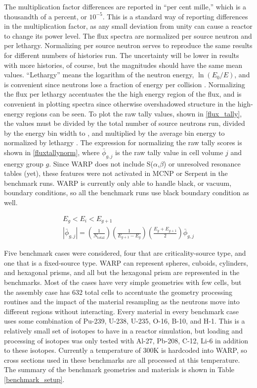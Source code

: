 The multiplication factor differences are reported in ``per cent mille,'' which is a thousandth of a percent, or $10^{-5}$.  This is a standard way of reporting differences in the multiplication factor, as any small deviation from unity can cause a reactor to change its power level.  The flux spectra are normalized per source neutron and per lethargy.  Normalizing per source neutron serves to reproduce the same results for different numbers of histories run.  The uncertainty will be lower in results with more histories, of course, but the magnitudes should have the same mean values.   ``Lethargy'' means the logarithm of the neutron energy, $\ln(E_0/E)$, and is convenient since neutrons lose a fraction of energy per collision \cite{duderstadt}.  Normalizing the flux per lethargy accentuates the the high energy region of the flux, and is convenient in plotting spectra since otherwise overshadowed structure in the high-energy regions can be seen.  To plot the raw tally values, shown in \eqref{flux_tally}, the values must be divided by the total number of source neutrons run, divided by the energy bin width to , and multiplied by the average bin energy to normalized by lethargy \cite{lethargyplot}.  The expression for normalizing the raw tally scores is shown in \eqref{fluxtallynorm}, where $\bar{\phi}_{g,j}$ is the raw tally value in cell volume $j$ and energy group $g$.  Since WARP does not include S($\alpha$,$\beta$) or unresolved resonance tables (yet), these features were not activated in MCNP or Serpent in the benchmark runs.  WARP is currently only able to handle black, or vacuum, boundary conditions, so all the benchmark runs use black boundary condition as well.

\begin{equation}
\label{fluxtallynorm}
\begin{gathered}
E_g < E_i < E_{g+1} \\
|\bar{\phi}_{g,j}| = \left( \frac{1}{N_\mathrm{total}}\right) \left(\frac{1}{E_{g+1}-E_g}\right) \left(\frac{E_g+E_{g+1}}{2} \right) \bar{\phi}_{g,j}
\end{gathered}
\end{equation}

Five benchmark cases were considered, four that are criticality-source type, and one that is a fixed-source type.  WARP can represent spheres, cuboids, cylinders, and hexagonal prisms, and all but the hexagonal prism are represented in the benchmarks.  Most of the cases have very simple geometries with few cells, but the assembly case has 632 total cells to accentuate the geometry processing routines and the impact of the material resampling as the neutrons move into different regions without interacting.  Every material in every benchmark case uses some combination of Pu-239, U-238, U-235, O-16, B-10, and H-1.  This is a relatively small set of isotopes to have in a reactor simulation, but loading and processing of isotopes was only tested with Al-27, Pb-208, C-12, Li-6 in addition to these isotopes.  Currently a temperature of 300K is hardcoded into WARP, so cross sections used in these benchmarks are all processed at this temperature.   The summary of the benchmark geometries and materials is shown in Table \ref{benchmark_setup}.  

